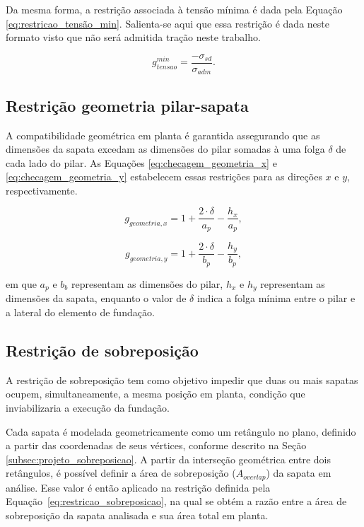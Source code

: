 Da mesma forma, a restrição associada à tensão mínima é dada pela Equação \eqref{eq:restricao_tensão_min}. Salienta-se aqui que essa restrição é dada neste formato visto que não será admitida tração neste trabalho.

\begin{equation}
g_{tensao}^{min} = \frac{-\sigma_{sd}}{\sigma_{adm}}.
    \label{eq:restricao_tensão_min}
\end{equation}

\subsection{Restrição geometria pilar-sapata}

A compatibilidade geométrica em planta é garantida assegurando que as dimensões da sapata excedam as dimensões do pilar somadas à uma folga $\delta$ de cada lado do pilar. As Equações \eqref{eq:checagem_geometria_x} e \eqref{eq:checagem_geometria_y} estabelecem essas restrições para as direções $x$ e $y$, respectivamente.

\begin{equation}
g_{geometria,x} = 1 + \frac{2 \cdot \delta }{a_p} -  \frac{h_x}{a_p},
    \label{eq:checagem_geometria_x}
\end{equation}

\begin{equation}
g_{geometria,y} = 1 + \frac{2 \cdot \delta }{b_p} -  \frac{h_y}{b_p},
    \label{eq:checagem_geometria_y}
\end{equation}


em que $a_p$ e $b_b$ representam as dimensões do pilar, $h_x$ e $h_y$ representam as dimensões da sapata, enquanto o valor de $\delta$ indica a folga mínima entre o pilar e a lateral do elemento de fundação.

\subsection{Restrição de sobreposição}

A restrição de sobreposição tem como objetivo impedir que duas ou mais sapatas ocupem, simultaneamente, a mesma posição em planta, condição que inviabilizaria a execução da fundação.

Cada sapata é modelada geometricamente como um retângulo no plano, definido a partir das coordenadas de seus vértices, conforme descrito na Seção \ref{subsec:projeto_sobreposicao}. A partir da interseção geométrica entre dois retângulos, é possível definir a área de sobreposição ($A_{overlap}$) da sapata em análise. Esse valor é então aplicado na restrição definida pela Equação~\eqref{eq:restricao_sobreposicao}, na qual se obtém a razão entre a área de sobreposição da sapata analisada e sua área total em planta.

